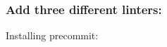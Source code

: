 \begin{itemize}
\begin{itemize}
    \end{itemize}
\end{itemize}

\subsubsection{Add three different linters:}
\label{log:add-three-different-linters}

Installing precommit:




